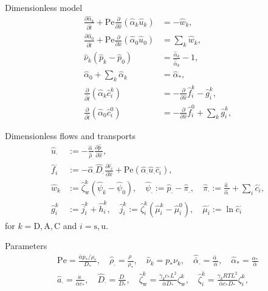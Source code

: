\documentclass{beamer}
\begin{document}
\begin{frame}{Dimensionless model}
    \begin{align}
        \frac{\partial \hat{\alpha}_k}{\partial \hat{t}}  + \mathrm{Pe}\frac{\partial}{\partial \hat{x}}\left( \hat{\alpha}_k \hat{u}_k \right) &= - \hat{w}_k,\\ \label{eq:nd_1steq}
        \frac{\partial\hat{\alpha}_0}{\partial \hat{t}}+\mathrm{Pe}\frac{\partial}{\partial \hat{x}}\left( \hat{\alpha}_0 \hat{u}_0 \right) &=\sum_k \hat{w}_k,\\
        \hat{\nu}_k\left( \hat{p}_k - \hat{p}_0 \right) &= \frac{\hat{\alpha}_k}{\hat{\bar{\alpha}}_k}-1,\\
        \hat{\alpha}_0 + \sum_{k} \hat{\alpha}_k &= \hat{\alpha}_*,\\
        \frac{\partial}{\partial \hat{t}}\left( \hat{\alpha}_k \hat{c}_i^k \right)&=-\frac{\partial}{\partial \hat{x}} \hat{f}_i^k - \hat{g}_i^k,\\
        \frac{\partial}{\partial \hat{t}}\left( \hat{\alpha}_0 \hat{c}_i^0 \right)&=-\frac{\partial}{\partial \hat{x}} \hat{f}_i^0 + \sum_k \hat{g}_i^k,
    \end{align}
\end{frame}

\begin{frame}{Dimensionless flows and transports}
    \begin{align}
        \hat{u}_\cdot &:= -\frac{\hat{\alpha}_\cdot}{\hat{\rho}_\cdot}\frac{\partial \hat{p}_\cdot}{\partial \hat{x}},\\
        \hat{f}_i^\cdot &:= -{\hat{\alpha}_\cdot}\hat{D}_\cdot \frac{\partial \hat{c}_i^\cdot}{\partial \hat{x}} + \mathrm{Pe}(\hat{\alpha}_\cdot\hat{u}_\cdot\hat{c}_i^\cdot),\\
        \hat{w}_k&:= \hat{\zeta}_\mathrm{w}^k\left( \hat{\psi}_k-\hat{\psi}_0 \right),\quad\hat{\psi}_\cdot := \hat{p}_\cdot - \hat{\pi}_.,\quad \hat{\pi}_\cdot := \frac{\hat{a}_\cdot}{\hat{\alpha}_\cdot}+\sum_i \hat{c}_i^\cdot,\\
        \hat{g}_i^k &:= \hat{j}_i^k+\hat{h}_i^k,\quad \hat{j}_i^k :=\hat{\zeta}_i^k(\hat{\mu}_i^k-\hat{\mu}_i^0),\quad \hat{\mu}_i^\cdot:=\ln \hat{c}_i^\cdot\label{eq:nd_lasteq}
    \end{align}
        for $k=\mathrm{D},\mathrm{A},\mathrm{C}$ and $i=\mathrm{s},\mathrm{u}$.
\end{frame}

\begin{frame}{Parameters}
    \begin{gather}
        \mathrm{Pe} = \frac{\bar{\alpha}p_*/\rho_*}{D_*},\quad \hat{\rho}_\cdot = \frac{\rho_\cdot}{\rho_*},\quad \hat{\nu}_k = p_*\nu_k,\quad \hat{\bar{\alpha}}_\cdot = \frac{\bar{\alpha}_\cdot}{\bar{\alpha}},\quad \hat{\alpha}_* = \frac{\alpha_*}{\bar{\alpha}}\\
        \hat{a}_\cdot = \frac{a_\cdot}{\bar{\alpha}c_*},\quad
        \hat{D}_\cdot = \frac{D_\cdot}{D_*},\quad \hat{\zeta}_\mathrm{w}^k = \frac{\gamma_k c_*L^2}{\bar{\alpha}D_*}\zeta_\mathrm{w}^k,\quad\hat{\zeta}_i^k = \frac{\gamma_kRT L^2}{\bar{\alpha}c_* D_*}\zeta_i^k,
    \end{gather}
\end{frame}
\end{document}
